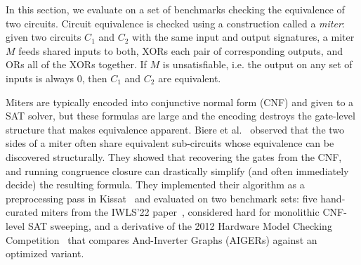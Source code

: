 


In this section, we evaluate on a set of benchmarks checking the equivalence of
two circuits. Circuit equivalence is checked using a construction called a
\emph{miter}: given two circuits $C_1$ and $C_2$ with the same input and output
signatures, a miter $M$ feeds shared inputs to both, XORs each pair of
corresponding outputs, and ORs all of the XORs together. If $M$ is
unsatisfiable, i.e. the output on any set of inputs is always $0$, then $C_1$
and $C_2$ are equivalent.

Miters are typically encoded into conjunctive normal form (CNF) and given to a
SAT solver, but these formulas are large and the encoding destroys the
gate-level structure that makes equivalence apparent. Biere et
al.~\cite{clausal-cc} observed that the two sides of a miter often share
equivalent sub-circuits whose equivalence can be discovered structurally. They
showed that recovering the gates from the CNF, and running congruence closure
can drastically simplify (and often immediately decide) the resulting formula.
They implemented their algorithm as a preprocessing pass in Kissat~\cite{kissat}
and evaluated on two benchmark sets: five hand-curated miters from the IWLS'22
paper~\cite{iwls}, considered hard for monolithic CNF-level SAT sweeping, and a
derivative of the 2012 Hardware Model Checking Competition~\cite{hwmcc} that
compares And-Inverter Graphs (AIGERs) against an optimized
variant.

